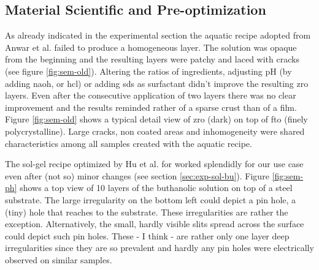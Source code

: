 \subsection{Material Scientific and Pre-optimization}
\label{sec:res-mat}
As already indicated in the experimental section the aquatic recipe adopted from Anwar et al.\cite{Anwar2017} failed to produce a homogeneous layer. 
The solution was opaque from the beginning and the resulting layers were patchy and laced with cracks (see figure \ref{fig:sem-old}). 
Altering the ratios of ingredients, adjusting pH (by adding \gls{naoh},  or \gls{hcl}) or adding \gls{sds} as surfactant didn't improve the resulting \gls{zro} layers. 
Even after the consecutive application of two layers there was no clear improvement and the results reminded rather of a sparse crust than of a film. 
%
Figure \ref{fig:sem-old} shows a typical detail view of \gls{zro} (dark) on top of \gls{fto} (finely polycrystalline). 
Large cracks, non coated areas and inhomogeneity were 
shared characteristics among 
all samples created with the aquatic recipe. 

The sol-gel recipe optimized by Hu et al.\cite{Hu2016} for  worked splendidly for our use case even after (not so) minor changes (see section \ref{sec:exp-sol-bu}). 
%
Figure \ref{fig:sem-ph} shows a top view of 10 layers of the buthanolic solution on top of a steel substrate. 
The large irregularity on the bottom left could depict a pin hole, a (tiny) hole that reaches to the substrate. 
These irregularities are rather the exception. 
Alternatively, the small, hardly visible slits spread across the surface could depict such pin holes. 
These - I think - are rather only one layer deep irregularities since they are so prevalent
and hardly any pin holes were electrically observed on similar samples. 


